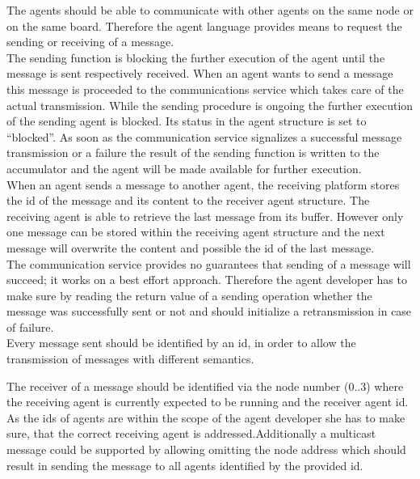 \documentclass{scrreprt}
\begin{document}
The agents should be able to communicate with other agents on the same node or on the same board. Therefore the agent 
language provides means to request the sending or receiving of a message.  \newline
\\
\noindent
The sending function is blocking the further execution of the agent until the message is sent respectively received. 
When an agent wants to send a message this message is proceeded to the communications service which takes care of the 
actual transmission. While the sending procedure is ongoing the further execution of the sending agent is blocked. 
Its status in the agent structure is set to “blocked”. As soon as the communication service signalizes a successful 
message transmission or a failure the result of the sending function is written to the accumulator and the agent will 
be made available for further execution.  \newline
\\
\noindent
When an agent sends a message to another agent, the receiving platform stores the id of the message and its content 
to the receiver agent structure. The receiving agent is able to retrieve the last message from its buffer. 
However only one message can be stored within the receiving agent structure and the next message will overwrite the 
content and possible the id of the last message.  \newline
\\
\noindent
The communication service provides no guarantees that sending of a message will succeed; it works on a best effort 
approach. Therefore the agent developer has to make sure by reading the return value of a sending operation whether 
the message was successfully sent or not and should initialize a retransmission in case of failure. \newline
\\
\noindent
Every message sent should be identified by an id, in order to allow the transmission of messages with different semantics.

The receiver of a message should be identified via the node number (0..3) where the receiving agent is currently expected
 to be running and the receiver agent id. As the ids of agents are within the scope of the agent developer she has to make 
sure, that the correct receiving agent is addressed.Additionally a multicast message could be supported by allowing omitting 
the node address which should result in sending the message to all agents identified by the provided id. 
\end{document}
